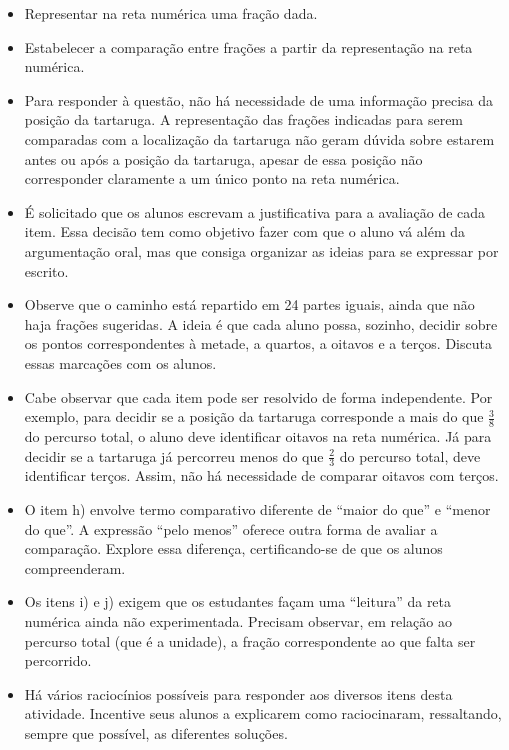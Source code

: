 \begin{atividade}\label{chap3-ativ9}
\objetivos
  \begin{itemize} %
    \item Representar na reta numérica uma fração dada.
    \item Estabelecer a comparação entre frações a partir da representação na reta numérica.
\end{itemize} %

\discussoes
\begin{itemize} %
  \item Para responder à questão, não há necessidade de uma informação precisa da posição da tartaruga. A representação das frações indicadas para serem comparadas com a localização da tartaruga não geram dúvida sobre estarem antes ou após a posição da tartaruga, apesar de essa posição não corresponder claramente a um único ponto na reta numérica.
    \item É solicitado que os alunos escrevam a justificativa para a avaliação de cada item. Essa decisão tem como objetivo fazer com que o aluno vá além da argumentação oral, mas que consiga organizar as ideias para se expressar por escrito.
    \item Observe que o caminho está repartido em 24 partes iguais, ainda que não haja frações sugeridas. A ideia é que cada aluno possa, sozinho, decidir sobre os pontos correspondentes à metade, a quartos, a oitavos e a terços. Discuta essas marcações com os alunos.
    \item Cabe observar que cada item pode ser resolvido de forma independente. Por exemplo, para decidir se a posição da tartaruga corresponde a mais do que       $\frac{3}{8}$       do percurso total, o aluno deve identificar oitavos na reta numérica. Já para decidir se a tartaruga já percorreu menos do que       $\frac{2}{3}$       do percurso total, deve identificar terços. Assim, não há necessidade de comparar oitavos com terços.
    \item O item h) envolve termo comparativo diferente de ``maior do que'' e ``menor do que''. A expressão ``pelo menos'' oferece outra forma de avaliar a comparação. Explore essa diferença, certificando-se de que os alunos compreenderam.
    \item Os itens i) e j) exigem que os estudantes façam uma ``leitura'' da reta numérica ainda não experimentada. Precisam observar, em relação ao percurso total (que é a unidade), a fração correspondente ao que falta ser percorrido.
    \item Há vários raciocínios possíveis para responder aos diversos itens desta atividade. Incentive seus alunos a explicarem como raciocinaram, ressaltando, sempre que possível, as diferentes soluções.
\end{itemize} %


\end{atividade}
